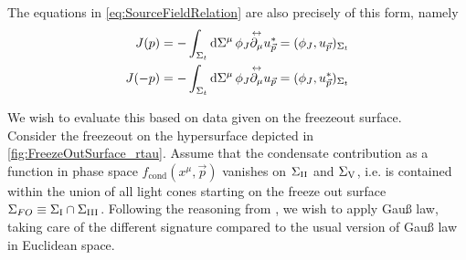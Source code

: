 The equations in \eqref{eq:SourceFieldRelation} are also precisely of this form, namely
\begin{subequations}
    \begin{align}
        J(p)&=-\int_{\Sigma_t}\text{d}\Sigma^\mu\,\phi_J\overset{\leftrightarrow}{\partial_\mu}u_{\vec{p}}^*=(\phi_J,u_{\vec{p}})_{\Sigma_t}\\
        J(-p)&=-\int_{\Sigma_t}\text{d}\Sigma^\mu\,\phi_J\overset{\leftrightarrow}{\partial_\mu}u_{\vec{p}}=(\phi_J,u_{\vec{p}}^*)_{\Sigma_t}
    \end{align}
\end{subequations}

We wish to evaluate this based on data given on the freezeout surface.\\
Consider the freezeout on the hypersurface depicted in \ref{fig:FreezeOutSurface_rtau}. Assume that the condensate contribution as a function in phase space $f_{\text{cond}}(x^\mu,\vec{p})$ vanishes on $\Sigma_{\text{\rom{2}}}$ and $\Sigma_{\text{\rom{5}}}$, i.e. is contained within the union of all light cones starting on the freeze out surface $\Sigma_{FO}\equiv\Sigma_{\text{\rom{1}}}\cap\Sigma_\text{{\rom{3}}}$.  Following the reasoning from \cite{KirchnerEtAl_2023}, we wish to apply Gauß law, taking care of the different signature compared to the usual version of Gauß law in Euclidean space.

